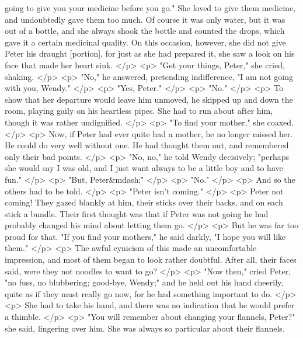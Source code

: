      going to give you your medicine before you go." She loved to give them
      medicine, and undoubtedly gave them too much. Of course it was only water,
      but it was out of a bottle, and she always shook the bottle and counted
      the drops, which gave it a certain medicinal quality. On this occasion,
      however, she did not give Peter his draught [portion], for just as she had
      prepared it, she saw a look on his face that made her heart sink.
    </p>
    <p>
      "Get your things, Peter," she cried, shaking.
    </p>
    <p>
      "No," he answered, pretending indifference, "I am not going with you,
      Wendy."
    </p>
    <p>
      "Yes, Peter."
    </p>
    <p>
      "No."
    </p>
    <p>
      To show that her departure would leave him unmoved, he skipped up and down
      the room, playing gaily on his heartless pipes. She had to run about after
      him, though it was rather undignified.
    </p>
    <p>
      "To find your mother," she coaxed.
    </p>
    <p>
      Now, if Peter had ever quite had a mother, he no longer missed her. He
      could do very well without one. He had thought them out, and remembered
      only their bad points.
    </p>
    <p>
      "No, no," he told Wendy decisively; "perhaps she would say I was old, and
      I just want always to be a little boy and to have fun."
    </p>
    <p>
      "But, Peter&mdash;"
    </p>
    <p>
      "No."
    </p>
    <p>
      And so the others had to be told.
    </p>
    <p>
      "Peter isn't coming."
    </p>
    <p>
      Peter not coming! They gazed blankly at him, their sticks over their
      backs, and on each stick a bundle. Their first thought was that if Peter
      was not going he had probably changed his mind about letting them go.
    </p>
    <p>
      But he was far too proud for that. "If you find your mothers," he said
      darkly, "I hope you will like them."
    </p>
    <p>
      The awful cynicism of this made an uncomfortable impression, and most of
      them began to look rather doubtful. After all, their faces said, were they
      not noodles to want to go?
    </p>
    <p>
      "Now then," cried Peter, "no fuss, no blubbering; good-bye, Wendy;" and he
      held out his hand cheerily, quite as if they must really go now, for he
      had something important to do.
    </p>
    <p>
      She had to take his hand, and there was no indication that he would prefer
      a thimble.
    </p>
    <p>
      "You will remember about changing your flannels, Peter?" she said,
      lingering over him. She was always so particular about their flannels.
